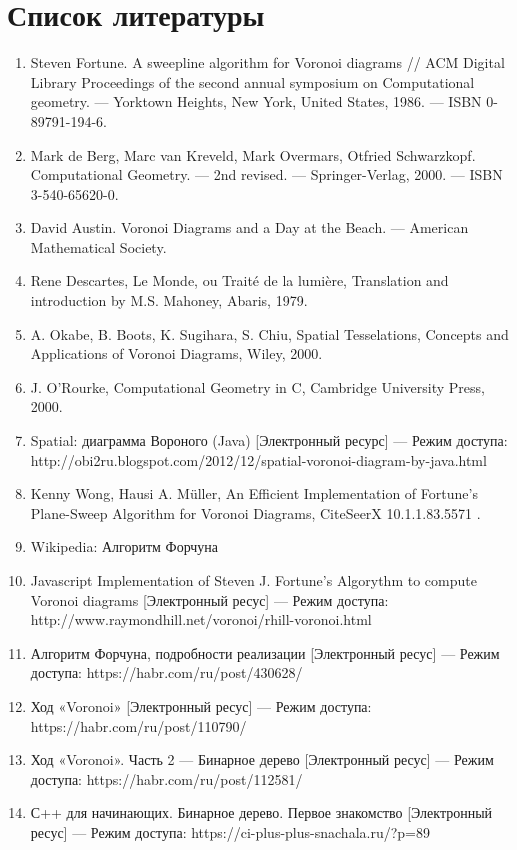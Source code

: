 \section{Список литературы}
\begin{enumerate}
\item Steven Fortune. A sweepline algorithm for Voronoi diagrams // ACM Digital Library Proceedings of the second annual symposium on Computational geometry. — Yorktown Heights, New York, United States, 1986. — ISBN 0-89791-194-6. 
\item Mark de Berg, Marc van Kreveld, Mark Overmars, Otfried Schwarzkopf. Computational Geometry. — 2nd revised. — Springer-Verlag, 2000. — ISBN 3-540-65620-0.
\item David Austin. Voronoi Diagrams and a Day at the Beach. — American Mathematical Society.
\item Rene Descartes, Le Monde, ou Traité de la lumière, Translation and introduction by M.S. Mahoney, Abaris, 1979.
\item A. Okabe, B. Boots, K. Sugihara, S. Chiu, Spatial Tesselations, Concepts and Applications of Voronoi Diagrams, Wiley, 2000.
\item J. O'Rourke, Computational Geometry in C, Cambridge University Press, 2000.
\item Spatial: диаграмма Вороного (Java) [Электронный ресурс] — Режим доступа: http://obi2ru.blogspot.com/2012/12/spatial-voronoi-diagram-by-java.html
\item Kenny Wong, Hausi A. Müller, An Efficient Implementation of Fortune's Plane-Sweep Algorithm for Voronoi Diagrams, CiteSeerX   10.1.1.83.5571 .
\item Wikipedia: Алгоритм Форчуна 
\item Javascript Implementation of Steven J. Fortune's Algorythm to compute Voronoi diagrams [Электронный ресус] — Режим доступа: http://www.raymondhill.net/voronoi/rhill-voronoi.html
\item Алгоритм Форчуна, подробности реализации [Электронный ресус] — Режим доступа: https://habr.com/ru/post/430628/
\item Ход «Voronoi» [Электронный ресус] — Режим доступа: https://habr.com/ru/post/110790/
\item Ход «Voronoi». Часть 2 — Бинарное дерево  [Электронный ресус] — Режим доступа: https://habr.com/ru/post/112581/
\item С++ для начинающих. Бинарное дерево. Первое знакомство [Электронный ресус] — Режим доступа: https://ci-plus-plus-snachala.ru/?p=89

\end{enumerate}
